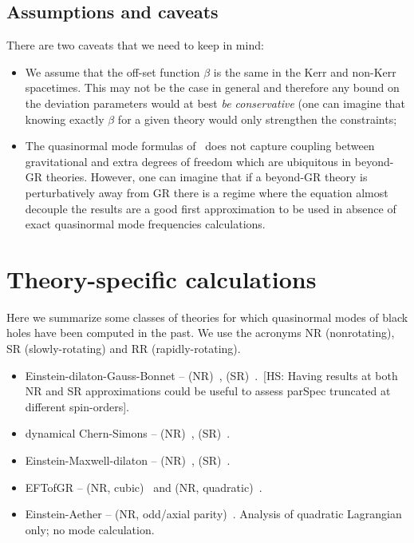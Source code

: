 \documentclass[aps,prd,10pt,preprint,
               notitlepage,onecolumn,superscriptaddress,
               eqsecnum,
               nofootinbib,tightenlines,floatfix]{revtex4-2}
\newcommand{\hs}[1]{{\color{magenta}[HS: #1]}}
\begin{document}
\subsection{Assumptions and caveats}
%
There are two caveats that we need to keep in mind:
%
\begin{itemize}
\item We assume that the off-set function $\beta$ is the same in the Kerr and
non-Kerr spacetimes. This may not be the case in general and therefore any
bound on the deviation parameters would at best \emph{be conservative} (one can
imagine that knowing exactly $\beta$ for a given theory would only strengthen
the constraints;
%
\item The quasinormal mode formulas of~\cite{Glampedakis:2017dvb} does not
capture coupling between gravitational and extra degrees of freedom which
are ubiquitous in beyond-GR theories.
%
However, one can imagine that if a beyond-GR theory is perturbatively away from
GR there is a regime where the equation almost decouple the results are a
good first approximation to be used in absence of exact quasinormal mode
frequencies calculations.
\end{itemize}

\section{Theory-specific calculations}

Here we summarize some classes of theories for which quasinormal modes
of black holes have been computed in the past. We use the acronyms NR (nonrotating),
SR (slowly-rotating) and RR (rapidly-rotating).

\begin{itemize}
    \item Einstein-dilaton-Gauss-Bonnet -- (NR)~\cite{Blazquez-Salcedo:2016enn},
        (SR)~\cite{Pierini:2021jxd}.~\hs{Having results at both NR and SR approximations
        could be useful to assess {\sc parSpec} truncated at different spin-orders}.
    \item dynamical Chern-Simons -- (NR)~\cite{Molina:2010fb}, (SR)~\cite{Wagle:2021tam,Srivastava:2021imr}.
    \item Einstein-Maxwell-dilaton -- (NR)~\cite{Ferrari:1984zz}, (SR)~\cite{Brito:2018hjh}.
    \item EFTofGR -- (NR, cubic)~\cite{deRham:2020ejn} and (NR, quadratic)~\cite{Cardoso:2018ptl}.
    \item Einstein-Aether -- (NR, odd/axial parity)~\cite{Tsujikawa:2021typ}. Analysis of quadratic Lagrangian only; no mode calculation.
\end{itemize}
\end{document}
